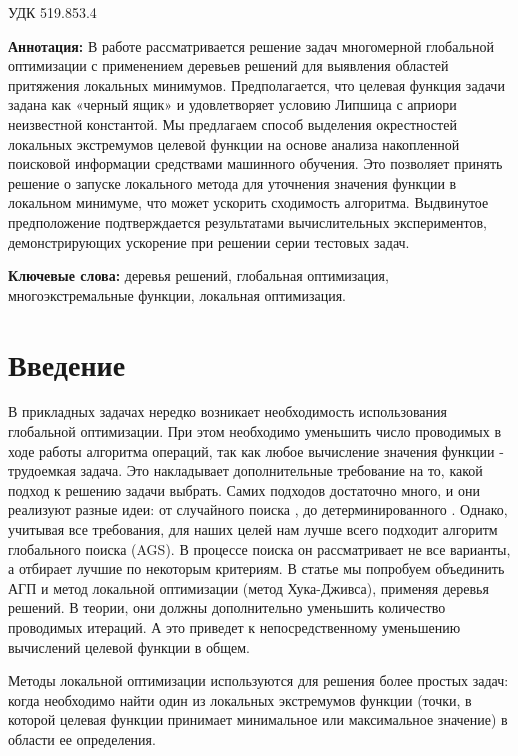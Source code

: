 \documentclass[12pt, a4paper, russian]{article}
\begin{document}
УДК 519.853.4

\vspace{\baselineskip}

\begin{small}
\textbf{Аннотация:} В работе рассматривается решение задач многомерной глобальной оптимизации с применением деревьев решений для выявления областей притяжения локальных минимумов. Предполагается, что целевая функция задачи задана как «черный ящик» и удовлетворяет условию Липшица с априори неизвестной константой. Мы предлагаем способ выделения окрестностей локальных экстремумов целевой функции на основе анализа накопленной поисковой информации средствами машинного обучения. Это позволяет принять решение о запуске локального метода для уточнения значения функции в локальном минимуме, что может ускорить сходимость алгоритма. Выдвинутое предположение подтверждается результатами вычислительных экспериментов, демонстрирующих ускорение при решении серии тестовых задач.

\textbf{Ключевые слова:} деревья решений, глобальная оптимизация, многоэкстремальные функции, локальная оптимизация.
\end{small}


\section{Введение}

В прикладных задачах нередко возникает необходимость использования глобальной оптимизации. При этом необходимо уменьшить число проводимых в ходе работы алгоритма операций, так как любое вычисление значения функции - трудоемкая задача. Это накладывает дополнительные требование на то, какой подход к решению задачи выбрать. Самих подходов достаточно много, и они реализуют разные идеи: от случайного поиска \cite{fio_bib1, fio_bib2, fio_bib3}, до детерминированного \cite{fio_bib4, fio_bib5, fio_bib6}. Однако, учитывая все требования, для наших целей нам лучше всего подходит алгоритм глобального поиска (AGS). В процессе поиска он рассматривает не все варианты, а отбирает лучшие по некоторым критериям. В статье мы попробуем объединить АГП и метод локальной оптимизации (метод Хука-Дживса), применяя деревья решений. В теории, они должны дополнительно уменьшить количество проводимых итераций. А это приведет к непосредственному уменьшению вычислений целевой функции в общем.

Методы локальной оптимизации используются для решения более простых задач: когда необходимо найти один из локальных экстремумов функции (точки, в которой целевая функции принимает минимальное или максимальное значение) в области ее определения.
\end{document}
